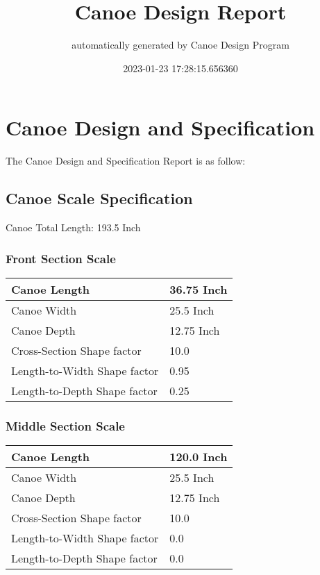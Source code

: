 \documentclass{article}%
\title{Canoe Design Report}%
\author{automatically generated by Canoe Design Program}%
\date{2023{-}01{-}23 17:28:15.656360}%
\begin{document}
%
\normalsize%
\selectfont%
\fontsize{12}{15}%
\pagestyle{fancy}%
\maketitle%
\thispagestyle{fancy}%
\section{Canoe Design and Specification}%
\label{sec:CanoeDesignandSpecification}%
The Canoe Design and Specification Report is as follow: %
\subsection{Canoe Scale Specification}%
\label{subsec:CanoeScaleSpecification}%
Canoe Total Length: 193.5 Inch%
\subsubsection{Front Section Scale}%
\label{ssubsec:FrontSectionScale}%
\renewcommand{\arraystretch}{1.5}%
\begin{tabular}{|l|l|}%
\hline%
Canoe Length&36.75 Inch\\%
\hline%
Canoe Width&25.5 Inch\\%
\hline%
Canoe Depth&12.75 Inch\\%
\hline%
Cross{-}Section Shape factor&10.0\\%
\hline%
Length{-}to{-}Width Shape factor&0.95\\%
\hline%
Length{-}to{-}Depth Shape factor&0.25\\%
\hline%
\end{tabular}

%
\subsubsection{Middle Section Scale}%
\label{ssubsec:MiddleSectionScale}%
\renewcommand{\arraystretch}{1.5}%
\begin{tabular}{|l|l|}%
\hline%
Canoe Length&120.0 Inch\\%
\hline%
Canoe Width&25.5 Inch\\%
\hline%
Canoe Depth&12.75 Inch\\%
\hline%
Cross{-}Section Shape factor&10.0\\%
\hline%
Length{-}to{-}Width Shape factor&0.0\\%
\hline%
Length{-}to{-}Depth Shape factor&0.0\\%
\hline%
\end{tabular}
\end{document}
